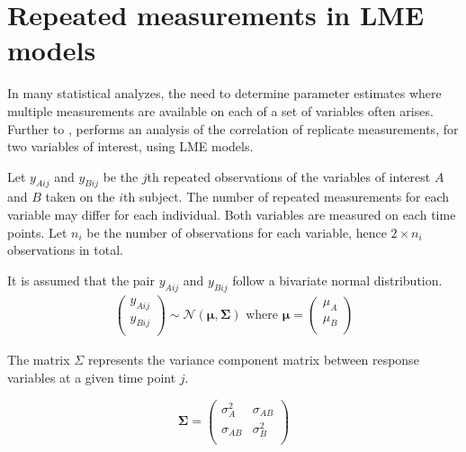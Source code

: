 \documentclass[12pt, a4paper]{article}
\theoremstyle{plain}
\theoremstyle{definition}
\theoremstyle{remark}
\begin{document}
\newpage                                                                    %
\section{Repeated measurements in LME models}

In many statistical analyzes, the need to determine parameter estimates where multiple measurements are available on each of a set of variables often arises. Further to \citet{lam}, \citet{hamlett} performs an analysis of the correlation of replicate measurements, for two variables of interest, using LME models.

Let $y_{Aij}$ and $y_{Bij}$ be the $j$th repeated observations of the variables of interest $A$ and $B$ taken on the $i$th subject. The number of repeated measurements for each variable may differ for each individual.
Both variables are measured on each time points. Let $n_{i}$ be the number of observations for each variable, hence $2\times n_{i}$ observations in total.

It is assumed that the pair $y_{Aij}$ and $y_{Bij}$ follow a bivariate normal distribution.
\begin{eqnarray*}
\left(
  \begin{array}{c}
    y_{Aij} \\
    y_{Bij} \\
  \end{array}
\right) \sim \mathcal{N}(
    \boldsymbol{\mu}, \boldsymbol{\Sigma})\mbox{   where } \boldsymbol{\mu} = \left(
  \begin{array}{c}
    \mu_{A} \\
    \mu_{B} \\
  \end{array}
\right)
\end{eqnarray*}

The matrix $\Sigma$ represents the variance component matrix between response variables at a given time point $j$.

\[
\boldsymbol{\Sigma} = \left( \begin{array}{cc}
                        \sigma^2_{A} & \sigma_{AB} \\
                        \sigma_{AB} & \sigma^2_{B}\\
                      \end{array}   \right)
\]
\end{document}
